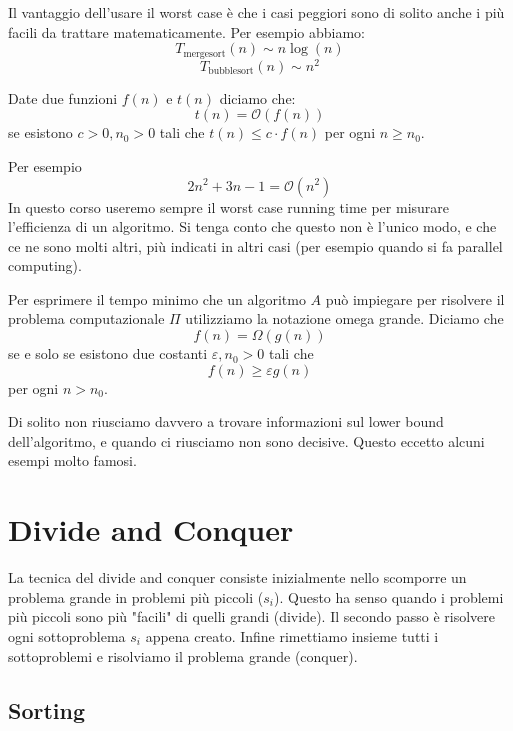 \documentclass[11pt]{scrartcl}
\newcommand{\bigo}{\mathcal{O}}
\begin{document}
	Il vantaggio dell'usare il worst case è che i casi peggiori sono di solito anche i più facili da trattare matematicamente. Per esempio abbiamo:
	$$T_{\text{mergesort}}(n)\sim n\log(n)$$
	$$T_{\text{bubblesort}}(n)\sim n^2$$
	\begin{definition}
		Date due funzioni $f(n)$ e $t(n)$ diciamo che:
		$$t(n)=\bigo(f(n))$$ 
		se esistono $c>0,n_0>0$ tali che $t(n)\le c\cdot f(n)$ per ogni $n\ge n_0$.
	\end{definition}
	Per esempio
	$$2n^2+3n-1=\bigo(n^2)$$
	In questo corso useremo sempre il worst case running time per misurare l'efficienza di un algoritmo. Si tenga conto che questo non è l'unico modo, e che ce ne sono molti altri, più indicati in altri casi (per esempio quando si fa parallel computing).
	\begin{definition}
		Per esprimere il tempo minimo che un algoritmo $A$ può impiegare per risolvere il problema computazionale $\Pi$ utilizziamo la notazione omega grande. Diciamo che
		$$f(n)=\Omega(g(n))$$
		se e solo se esistono due costanti $\varepsilon,n_0>0$ tali che 
		$$f(n)\ge \varepsilon g(n)$$
		per ogni $n>n_0$.
	\end{definition}
	Di solito non riusciamo davvero a trovare informazioni sul lower bound dell'algoritmo, e quando ci riusciamo non sono decisive. Questo eccetto alcuni esempi molto famosi.
	
	\newpage
	
	\section{Divide and Conquer}
	
	La tecnica del divide and conquer consiste inizialmente nello scomporre un problema grande in problemi più piccoli ($s_i$). Questo ha senso quando i problemi più piccoli sono più "facili" di quelli grandi (divide). Il secondo passo è risolvere ogni sottoproblema $s_i$ appena creato. Infine rimettiamo insieme tutti i sottoproblemi e risolviamo il problema grande (conquer).
	
	\subsection{Sorting}
	
\end{document}
